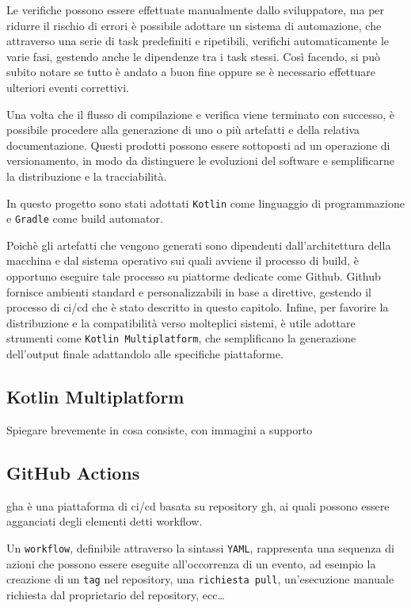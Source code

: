 \documentclass[12pt,a4paper,openright,twoside]{book}
\begin{document}
Le verifiche possono essere effettuate 
manualmente dallo sviluppatore, ma per ridurre il rischio di errori è
possibile adottare un sistema di automazione, che attraverso una serie di task predefiniti
e ripetibili, verifichi automaticamente le varie fasi,
gestendo anche le dipendenze tra i task stessi.
Così facendo, si può subito notare se tutto è andato a buon fine oppure 
se è necessario effettuare ulteriori eventi correttivi.

Una volta che il flusso di compilazione e verifica viene terminato con successo,
è possibile procedere alla generazione di uno o più artefatti e della relativa documentazione.
Questi prodotti possono essere sottoposti ad un operazione di versionamento,
in modo da distinguere le evoluzioni del software e semplificarne la distribuzione
e la tracciabilità.

In questo progetto sono stati adottati \texttt{Kotlin} come linguaggio di programmazione
e \texttt{Gradle} come build automator.

Poichè gli artefatti che vengono generati sono dipendenti dall'architettura della macchina
e dal sistema operativo sui quali avviene il processo di build, è opportuno eseguire tale processo
su piattorme dedicate come Github.
Github fornisce ambienti standard e personalizzabili
in base a direttive, gestendo il processo di \ac{ci}/\ac{cd} che è stato descritto in questo capitolo. 
Infine, per favorire la distribuzione e la compatibilità verso molteplici sistemi,
è utile adottare strumenti come \texttt{Kotlin Multiplatform},
che semplificano la generazione dell'output finale adattandolo alle specifiche piattaforme. 


\subsection{Kotlin Multiplatform}
Spiegare brevemente in cosa consiste, con immagini a supporto

\subsection{GitHub Actions}
 \ac{gha} è una piattaforma di \ac{ci}/\ac{cd} basata su repository \ac{gh},
 ai quali possono essere agganciati degli elementi detti workflow.

 Un \texttt{workflow}, definibile attraverso la sintassi \texttt{YAML}, rappresenta una sequenza di azioni che possono essere eseguite
 all'occorrenza di un evento, ad esempio la creazione di un \texttt{tag} nel repository,
 una \texttt{richiesta pull}, un'esecuzione manuale richiesta dal proprietario del repository, ecc\dots
\end{document}
